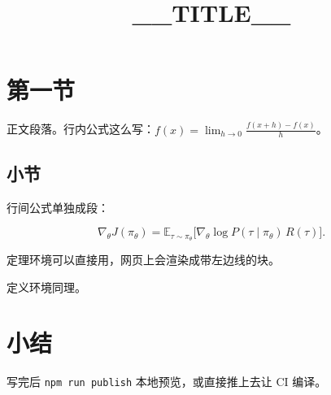 \documentclass[UTF8,fontset=fandol]{ctexart}
\title{__TITLE__}
\author{}
\date{}
\begin{document}
\maketitlecolored

\section{第一节}

正文段落。行内公式这么写：$f(x) = \lim_{h\to 0}\frac{f(x+h)-f(x)}{h}$。

\subsection{小节}

行间公式单独成段：

\[
\nabla_\theta J(\pi_\theta) = \mathbb{E}_{\tau\sim\pi_\theta}\bigl[\nabla_\theta \log P(\tau\mid\pi_\theta)\, R(\tau)\bigr].
\]

\begin{theorem}[示例]
定理环境可以直接用，网页上会渲染成带左边线的块。
\end{theorem}

\begin{definition}
定义环境同理。
\end{definition}

\section{小结}

写完后 \texttt{npm run publish} 本地预览，或直接推上去让 CI 编译。
\end{document}
